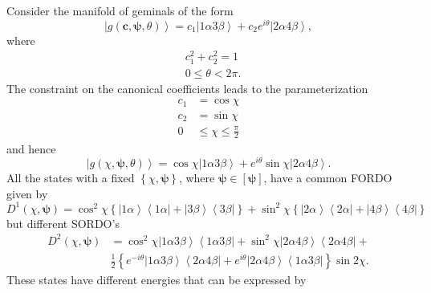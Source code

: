 \documentclass[aps,preprint]{revtex4}%
\begin{document}
Consider the manifold of geminals of the form
\begin{equation}
\left\vert g\left(  \boldsymbol{c},\boldsymbol{\psi},\theta\right)
\right\rangle =c_{1}\left\vert 1\alpha3\beta\right\rangle +c_{2}e^{i\theta
}\left\vert 2\alpha4\beta\right\rangle ,
\end{equation}
where
\begin{align}
&  c_{1}^{2}+c_{2}^{2}=1\nonumber\\
&  0\leq\theta<2\pi.
\end{align}
The constraint on the canonical coefficients leads to the parameterization
\begin{align}
c_{1} &  =\cos\chi\nonumber\\
c_{2} &  =\sin\chi\nonumber\\
0 &  \leq\chi\leq\frac{\pi}{2}%
\end{align}
and hence%
\begin{equation}
\left\vert g\left(  \chi,\boldsymbol{\psi},\theta\right)  \right\rangle
=\cos\chi\left\vert 1\alpha3\beta\right\rangle +e^{i\theta}\sin\chi\left\vert
2\alpha4\beta\right\rangle .
\end{equation}
All the states with a fixed $\left\{  \chi,\boldsymbol{\psi}\right\}  $, where
$\boldsymbol{\psi\in}\left[  \boldsymbol{\psi}\right]  $, have a common FORDO
given by%
\[
D^{1}\left(  \chi,\boldsymbol{\psi}\right)  =\cos^{2}\chi\left\{  \left\vert
1\alpha\right\rangle \left\langle 1\alpha\right\vert +\left\vert
3\beta\right\rangle \left\langle 3\beta\right\vert \right\}  +\sin^{2}%
\chi\left\{  \left\vert 2\alpha\right\rangle \left\langle 2\alpha\right\vert
+\left\vert 4\beta\right\rangle \left\langle 4\beta\right\vert \right\}
\]
but different SORDO's%
\begin{align}
D^{2}\left(  \chi,\boldsymbol{\psi}\right)   &  =\cos^{2}\chi\left\vert
1\alpha3\beta\right\rangle \left\langle 1\alpha3\beta\right\vert +\sin^{2}%
\chi\left\vert 2\alpha4\beta\right\rangle \left\langle 2\alpha4\beta
\right\vert +\nonumber\\
&  \frac{1}{2}\left\{  e^{-i\theta}\left\vert 1\alpha3\beta\right\rangle
\left\langle 2\alpha4\beta\right\vert +e^{i\theta}\left\vert 2\alpha
4\beta\right\rangle \left\langle 1\alpha3\beta\right\vert \right\}  \sin2\chi.
\end{align}
These states have different energies that can be expressed by%
\end{document}

